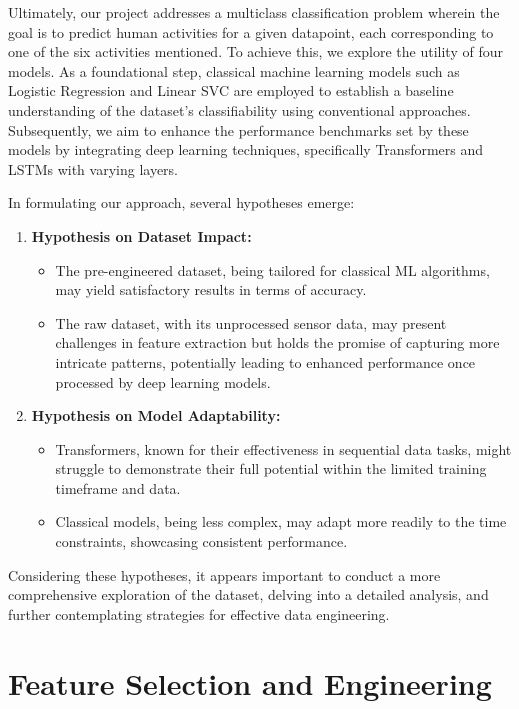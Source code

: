 \documentclass[11pt]{article}
\begin{document}
Ultimately, our project addresses a multiclass classification problem wherein the goal is to predict human activities for a given datapoint, each corresponding to one of the six activities mentioned. To achieve this, we explore the utility of four models. As a foundational step, classical machine learning models such as Logistic Regression and Linear SVC are employed to establish a baseline understanding of the dataset's classifiability using conventional approaches. Subsequently, we aim to enhance the performance benchmarks set by these models by integrating deep learning techniques, specifically Transformers and LSTMs with varying layers.

In formulating our approach, several hypotheses emerge:

\begin{enumerate}

  \item \textbf{Hypothesis on Dataset Impact:}
   \begin{itemize}
      \item The pre-engineered dataset, being tailored for classical ML algorithms, may yield satisfactory results in terms of accuracy.
      \item The raw dataset, with its unprocessed sensor data, may present challenges in feature extraction but holds the promise of capturing more intricate patterns, potentially leading to enhanced performance once processed by deep learning models.
   \end{itemize}

  \item \textbf{Hypothesis on Model Adaptability:}
   \begin{itemize}
      \item Transformers, known for their effectiveness in sequential data tasks, might struggle to demonstrate their full potential within the limited training timeframe and data.
      \item Classical models, being less complex, may adapt more readily to the time constraints, showcasing consistent performance.
   \end{itemize}

\end{enumerate}

Considering these hypotheses, it appears important to conduct a more comprehensive exploration of the dataset, delving into a detailed analysis, and further contemplating strategies for effective data engineering.
\section{Feature Selection and Engineering}
\end{document}
